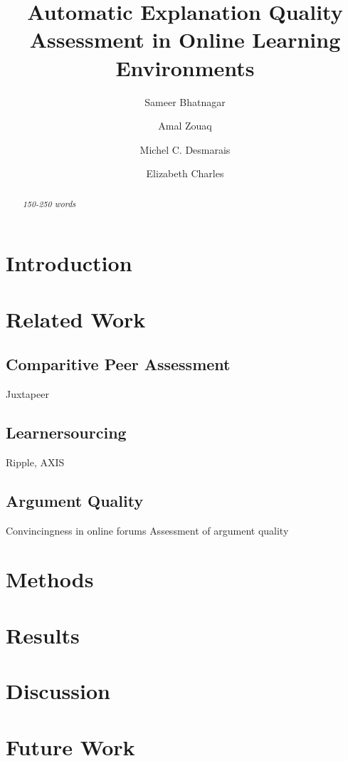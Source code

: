 \documentclass[runningheads]{llncs}
\begin{document}
%
\title{Automatic Explanation Quality Assessment in Online Learning Environments}
%
\author{Sameer Bhatnagar \and
Amal Zouaq \and
Michel C. Desmarais \and
Elizabeth Charles
}
%

%
\maketitle              %
%
\begin{abstract}
\textit{
	150-250 words
}

\end{abstract}


\section{Introduction}

\section{Related Work}
\subsection{Comparitive Peer Assessment}
Juxtapeer\cite{cambre_juxtapeer:_2018}
\subsection{Learnersourcing}
Ripple\cite{khosravi_ripple_2019}, AXIS\cite{williams_axis:_2016}

\subsection{Argument Quality}
Convincingness in online forums \cite{tan_winning_2016}
Assessment of argument quality \cite{toledo_automatic_2019}

\section{Methods}


\section{Results}

\section{Discussion}

\section{Future Work}

 
 
\end{document}
